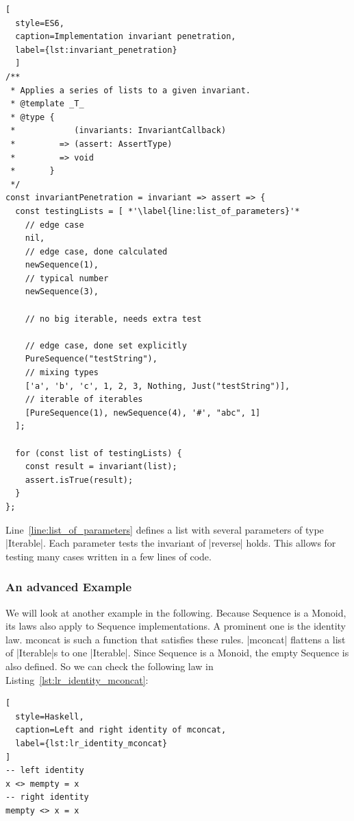 \begin{lstlisting}[
  style=ES6, 
  caption=Implementation invariant penetration,
  label={lst:invariant_penetration}
  ]
/**
 * Applies a series of lists to a given invariant.
 * @template _T_
 * @type {
 *            (invariants: InvariantCallback)
 *         => (assert: AssertType)
 *         => void
 *       }
 */
const invariantPenetration = invariant => assert => {
  const testingLists = [ *'\label{line:list_of_parameters}'*
    // edge case
    nil,                                                   
    // edge case, done calculated
    newSequence(1),                                        
    // typical number
    newSequence(3),                                        

    // no big iterable, needs extra test

    // edge case, done set explicitly
    PureSequence("testString"),                            
    // mixing types
    ['a', 'b', 'c', 1, 2, 3, Nothing, Just("testString")], 
    // iterable of iterables
    [PureSequence(1), newSequence(4), '#', "abc", 1]       
  ];

  for (const list of testingLists) {
    const result = invariant(list);
    assert.isTrue(result);
  }
};
\end{lstlisting}

Line~\ref{line:list_of_parameters} defines a list with several parameters of
type |Iterable|. Each parameter tests the invariant of |reverse| holds. 
This allows for testing many cases written in a few lines of code.

\subsubsection{An advanced Example}
\label{subsub:An advanced Example}
We will look at another example in the following. Because Sequence is a Monoid,
its laws also apply to Sequence implementations. A
prominent one is the identity law\cite{haskell_monoid}. mconcat is such a function
that satisfies these rules. |mconcat| flattens a list of |Iterable|s to one
|Iterable|. Since Sequence is a Monoid, the empty Sequence is also defined. So
we can check the following law in Listing~\ref{lst:lr_identity_mconcat}:

\begin{lstlisting}[
  style=Haskell,
  caption=Left and right identity of mconcat,
  label={lst:lr_identity_mconcat}
]
-- left identity
x <> mempty = x
-- right identity
mempty <> x = x
\end{lstlisting}

